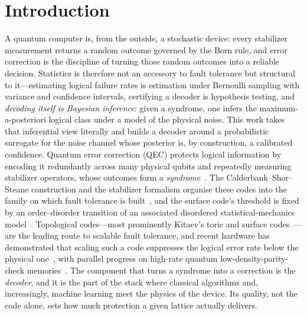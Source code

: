 \documentclass[reprint,aps,prxquantum,amsmath,amssymb,floatfix,nofootinbib,longbibliography]{revtex4-2}
\theoremstyle{definition}
\theoremstyle{remark}
\theoremstyle{plain}
\begin{document}
\maketitle

\section{Introduction}
\label{sec:introduction}

A quantum computer is, from the outside, a stochastic device: every stabilizer measurement returns a random outcome governed by the Born rule, and error correction is the discipline of turning those random outcomes into a reliable decision. Statistics is therefore not an accessory to fault tolerance but structural to it---estimating logical failure rates is estimation under Bernoulli sampling with variance and confidence intervals, certifying a decoder is hypothesis testing, and \emph{decoding itself is Bayesian inference}: given a syndrome, one infers the maximum-a-posteriori logical class under a model of the physical noise. This work takes that inferential view literally and builds a decoder around a probabilistic surrogate for the noise channel whose posterior is, by construction, a calibrated confidence. Quantum error correction (QEC) protects logical information by encoding it redundantly across many physical qubits and repeatedly measuring stabilizer operators, whose outcomes form a \emph{syndrome}~\cite{shor1995scheme,nielsen2010quantum,terhal2015quantum}. The Calderbank--Shor--Steane construction and the stabilizer formalism organise these codes into the family on which fault tolerance is built~\cite{calderbank1996good,steane1996error,gottesman1997stabilizer}, and the surface code's threshold is fixed by an order--disorder transition of an associated disordered statistical-mechanics model~\cite{wang2003confinement}. Topological codes---most prominently Kitaev's toric and surface codes~\cite{kitaev2003fault,dennis2002topological,fowler2012surface}---are the leading route to scalable fault tolerance, and recent hardware has demonstrated that scaling such a code suppresses the logical error rate below the physical one~\cite{google2023suppressing,acharya2024below}, with parallel progress on high-rate quantum low-density-parity-check memories~\cite{bravyi2024high}. The component that turns a syndrome into a correction is the \emph{decoder}, and it is the part of the stack where classical algorithms and, increasingly, machine learning meet the physics of the device. Its quality, not the code alone, sets how much protection a given lattice actually delivers.
\end{document}
